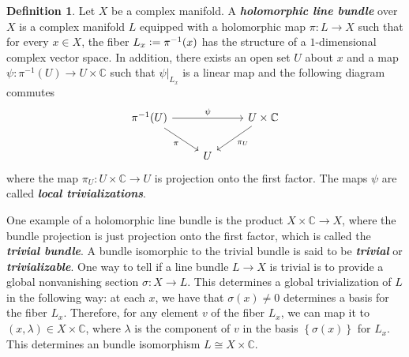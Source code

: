 \documentclass[psamsfonts, 12pt]{amsart}
\theoremstyle{definition}
\newtheorem{defn}[thm]{Definition}
\theoremstyle{remark}
\newcommand{\ib}[1]{\textbf{\textit{#1}}}
\newcommand{\C}{\mathbb{C}}
\newcommand{\inv}{^{-1}}
\newcommand{\set}[1]{\left\lbrace #1 \right\rbrace}
\newcommand{\defeq}{\vcentcolon=}
\begin{document}
%
\begin{defn}
Let $X$ be a complex manifold. A \ib{holomorphic line bundle} over $X$ is a complex
manifold $L$ equipped with a holomorphic map $\pi : L \to X$ such that for every
$x \in X$,  the fiber $L_x \defeq \pi\inv(x)$ has the structure of a $1$-dimensional
complex vector space. In addition, there exists an open set $U$ about $x$ and
a map $\psi : \pi\inv(U) \to U \times \C$ such that $\psi\vert_{L_x}$ is a linear
map and the following diagram commutes
\[\begin{tikzcd}
\pi\inv(U) \ar[dr, "\pi"'] \ar[rr, "\psi"] & & U \times \C \ar[dl, "\pi_U"]\\
& U
\end{tikzcd}\]
where the map $\pi_U : U \times \C \to U$ is projection onto the first factor.
The maps $\psi$ are called \ib{local trivializations}.
\end{defn}
%
One example of a holomorphic line bundle is the product $X \times \C \to X$, where
the bundle projection is just projection onto the first factor, which
is called the \ib{trivial bundle}. A bundle isomorphic to the trivial bundle
is said to be \ib{trivial} or \ib{trivializable}.
One way to tell if a line bundle $L \to X$ is trivial is to provide a global
nonvanishing section $\sigma : X \to L$. This determines a global trivialization of $L$
in the following way: at each $x$, we have that $\sigma(x) \neq 0$ determines a basis for
the fiber $L_x$. Therefore, for any element $v$ of the fiber $L_x$, we can map it
to $(x, \lambda) \in X \times \C$, where $\lambda$ is the component of $v$ in the basis
$\set{\sigma(x)}$ for $L_x$. This determines an bundle isomorphism
$L \cong X \times \C$. \\
\end{document}
